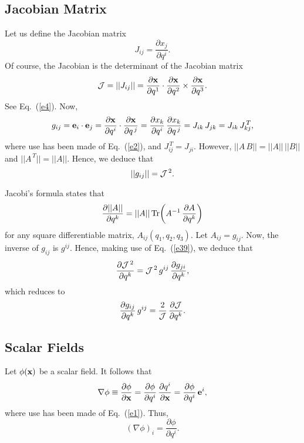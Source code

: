 \documentclass[12pt,prb,aps,notitlepage]{revtex4-1}
\begin{document}
\subsection{Jacobian Matrix}
 Let us define the Jacobian matrix
 \begin{equation}
 J_{ij} = \frac{\partial x_j}{\partial q^i}.
 \end{equation}
 Of course, the Jacobian is the determinant of the Jacobian matrix
 \begin{equation}
 {\cal J} = ||J_{ij}||= \frac{\partial{\bf x}}{\partial q^1}\cdot\frac{\partial {\bf x}}{\partial q^2}\times\frac{\partial{\bf x}}{\partial q^3}.
 \end{equation}
 See Eq.~(\ref{e4}). 
 Now,
 \begin{equation}
 g_{ij} = {\bf e}_i\cdot{\bf e}_j= \frac{\partial{\bf x}}{\partial q^i}\cdot\frac{{\partial {\bf x}}}{\partial q^{\,j}}= \frac{\partial x_k}{\partial q^i}\,\frac{{\partial x_k}}{\partial q^{\,j}}= J_{ik}\,J_{jk} = J_{ik}\,J^{\,T}_{kj},
 \end{equation}
 where use has been made of Eq.~(\ref{e2}), and $J^{\,T}_{ij}= J_{ji}$. However, $||A\,B|| = ||A||\,||B||$ and $||A^{\,T}|| = ||A||$. Hence, we deduce that
 \begin{equation}\label{e39}
 ||g_{ij}|| = {\cal J}^{\,2}.
 \end{equation}
 
 Jacobi's formula states that
 \begin{equation}
 \frac{\partial ||A||}{\partial q^k} = ||A||\,{\rm Tr}\!\left(A^{-1}\,\frac{\partial A}{\partial q^k}\right)
 \end{equation}
 for any square differentiable matrix, $A_{ij}(q_1,q_2,q_3)$. 
 Let $A_{ij}= g_{ij}$. Now, the inverse of $g_{ij}$ is $g^{ij}$. Hence, making use of Eq.~(\ref{e39}), we deduce that
 \begin{equation}
 \frac{\partial{\cal J}^{\,2}}{\partial q^k} = {\cal J}^{\,2}\,g^{ij}\,\frac{\partial g_{ji}}{\partial q^k},
 \end{equation}
 which reduces to
 \begin{equation}\label{e42}
 \frac{\partial g_{ij}}{\partial q^k}\,g^{ij} = \frac{2}{\cal J}\,\frac{\partial{\cal J}}{\partial q^k}.
 \end{equation}
 
\subsection{Scalar Fields}
Let $\phi({\bf x})$ be a scalar field. It follows that
\begin{equation}
\nabla \phi \equiv \frac{\partial \phi}{\partial{\bf x}}  = \frac{\partial\phi}{\partial q^i}\,\frac{\partial q^i}{\partial{\bf x}}= \frac{\partial\phi}{\partial q^i}\,{\bf e}^i,
\end{equation}
where use has been made of Eq.~(\ref{e1}). Thus,
\begin{equation}
(\nabla\phi)_i = \frac{\partial\phi}{\partial q^i}.
\end{equation}
\end{document}
